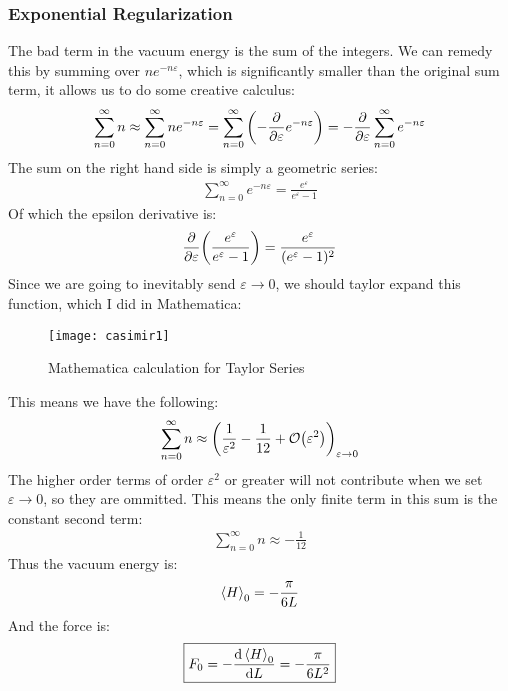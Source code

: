 \documentclass[12pt]{article}
\newcommand{\veps}{\varepsilon}
\begin{document}
\subsubsection{Exponential Regularization}
The bad term in the vacuum energy is the sum of the integers. We can remedy this by summing over $ne^{-n\veps}$, which is significantly smaller than the original sum term, it allows us to do some creative calculus:
\begin{align*}
  \sum_{n=0}^\infty n
  \approx\sum_{n=0}^\infty n e^{-n\veps}
  =\sum_{n=0}^\infty \qty(-\pdv{\veps}e^{-n\veps})
  =-\pdv{\veps}\sum_{n=0}^\infty e^{-n\veps}
\end{align*}
The sum on the right hand side is simply a geometric series:
\begin{align*}
  \sum_{n=0}^\infty e^{-n\veps}=\frac{e^\veps}{e^\veps-1}
\end{align*}
Of which the epsilon derivative is:
\begin{align*}
  \pdv{\veps}\qty(\frac{e^\veps}{e^\veps-1})=\frac{e^\veps}{(e^\veps-1)^2}
\end{align*}
Since we are going to inevitably send $\veps\to0$, we should taylor expand this function, which I did in Mathematica:
\begin{figure}[H]
  \centering
  \texttt{[image: casimir1]}
  \caption{Mathematica calculation for Taylor Series}
\end{figure}
This means we have the following:
\begin{align*}
  \sum_{n=0}^\infty n\approx
  \qty(\frac1{\veps^2}-\frac1{12}+\order{\veps^2})_{\veps\to0}
\end{align*}
The higher order terms of order $\veps^2$ or greater will not contribute when we set $\veps\to0$, so they are ommitted. This means the only finite term in this sum is the constant second term:
\begin{align*}
  \sum_{n=0}^\infty n\approx-\frac1{12}
\end{align*}
Thus the vacuum energy is:
\begin{align*}
  \ev{H}_0=-\frac{\pi}{6L}
\end{align*}
And the force is:
\begin{align}
  \boxed{F_0=-\dv{\ev{H}_0}{L}=-\frac{\pi}{6L^2}}
\end{align}
\end{document}
